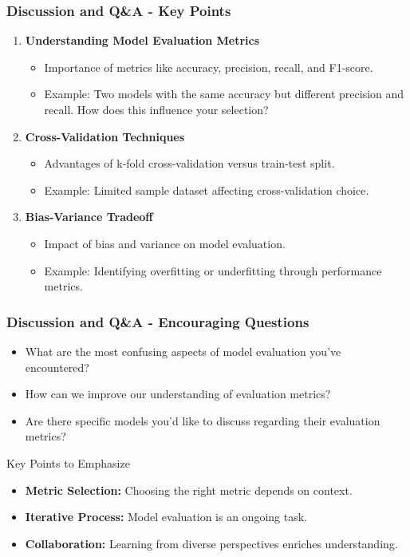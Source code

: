 \documentclass[aspectratio=169]{beamer}
\begin{document}
\begin{frame}[fragile]
    \frametitle{Discussion and Q\&A - Key Points}
    \begin{enumerate}
        \item \textbf{Understanding Model Evaluation Metrics}
            \begin{itemize}
                \item Importance of metrics like accuracy, precision, recall, and F1-score.
                \item Example: Two models with the same accuracy but different precision and recall. How does this influence your selection?
            \end{itemize}
        \item \textbf{Cross-Validation Techniques}
            \begin{itemize}
                \item Advantages of k-fold cross-validation versus train-test split.
                \item Example: Limited sample dataset affecting cross-validation choice.
            \end{itemize}
        \item \textbf{Bias-Variance Tradeoff}
            \begin{itemize}
                \item Impact of bias and variance on model evaluation.
                \item Example: Identifying overfitting or underfitting through performance metrics.
            \end{itemize}
    \end{enumerate}
\end{frame}

\begin{frame}[fragile]
    \frametitle{Discussion and Q\&A - Encouraging Questions}
    \begin{itemize}
        \item What are the most confusing aspects of model evaluation you’ve encountered?
        \item How can we improve our understanding of evaluation metrics?
        \item Are there specific models you’d like to discuss regarding their evaluation metrics?
    \end{itemize}

    \begin{block}{Key Points to Emphasize}
        \begin{itemize}
            \item \textbf{Metric Selection:} Choosing the right metric depends on context.
            \item \textbf{Iterative Process:} Model evaluation is an ongoing task.
            \item \textbf{Collaboration:} Learning from diverse perspectives enriches understanding.
        \end{itemize}
    \end{block}
\end{frame}
\end{document}
